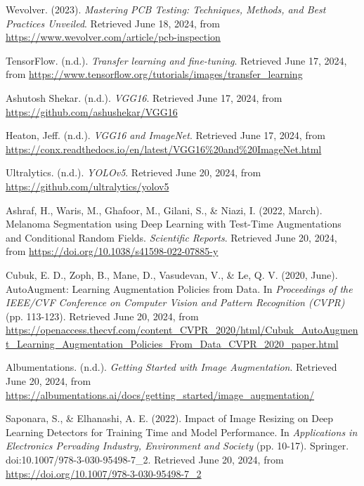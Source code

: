 \documentclass[12pt]{article}
\begin{document}
\begin{thebibliography}{10} 
    Wevolver. (2023). \textit{Mastering PCB Testing: Techniques, Methods, and Best Practices Unveiled}. Retrieved June 18, 2024, from \url{https://www.wevolver.com/article/pcb-inspection}

    TensorFlow. (n.d.). \textit{Transfer learning and fine-tuning}. Retrieved June 17, 2024, from \url{https://www.tensorflow.org/tutorials/images/transfer_learning}

    Ashutosh Shekar. (n.d.). \textit{VGG16}. Retrieved June 17, 2024, from \url{https://github.com/ashushekar/VGG16}

    Heaton, Jeff. (n.d.). \textit{VGG16 and ImageNet}. Retrieved June 17, 2024, from \url{https://conx.readthedocs.io/en/latest/VGG16%20and%20ImageNet.html}

    Ultralytics. (n.d.). \textit{YOLOv5}. Retrieved June 20, 2024, from \url{https://github.com/ultralytics/yolov5}

    Ashraf, H., Waris, M., Ghafoor, M., Gilani, S., \& Niazi, I. (2022, March). Melanoma Segmentation using Deep Learning with Test-Time Augmentations and Conditional Random Fields. \textit{Scientific Reports}. Retrieved June 20, 2024, from \url{https://doi.org/10.1038/s41598-022-07885-y}

    Cubuk, E. D., Zoph, B., Mane, D., Vasudevan, V., \& Le, Q. V. (2020, June). AutoAugment: Learning Augmentation Policies from Data. In \textit{Proceedings of the IEEE/CVF Conference on Computer Vision and Pattern Recognition (CVPR)} (pp. 113-123). Retrieved June 20, 2024, from \url{https://openaccess.thecvf.com/content_CVPR_2020/html/Cubuk_AutoAugment_Learning_Augmentation_Policies_From_Data_CVPR_2020_paper.html}

    Albumentations. (n.d.). \textit{Getting Started with Image Augmentation}. Retrieved June 20, 2024, from \url{https://albumentations.ai/docs/getting_started/image_augmentation/}

    Saponara, S., \& Elhanashi, A. E. (2022). Impact of Image Resizing on Deep Learning Detectors for Training Time and Model Performance. In \textit{Applications in Electronics Pervading Industry, Environment and Society} (pp. 10-17). Springer. doi:10.1007/978-3-030-95498-7\_2. Retrieved June 20, 2024, from \url{https://doi.org/10.1007/978-3-030-95498-7_2}


\end{thebibliography}
\end{document}
